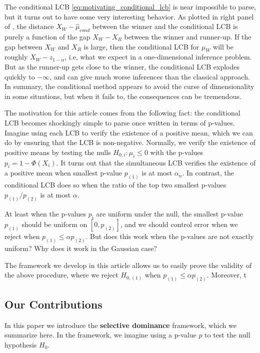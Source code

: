 \documentclass{article}
\begin{document}
The conditional LCB \eqref{eq:motivating_conditional_lcb} is near impossible to parse, but it turns out to have some very interesting behavior. As plotted in right panel of , the distance $X_W - \hat{\mu}_{cond}$ between the winner and the conditional LCB is purely a function of the gap $X_W - X_R$ between the winner and runner-up. If the gap between $X_W$ and $X_R$ is large, then the conditional LCB for $\mu_W$ will be roughly $X_{W} - z_{1-\alpha}$, i.e, what we expect in a one-dimensional inference problem. But as the runner-up gets close to the winner, the conditional LCB explodes quickly to $-\infty$, and can give much worse inferences than the classical approach. In summary, the conditional method appears to avoid the curse of dimensionality in some situations, but when it fails to, the consequences can be tremendous. 

The motivation for this article comes from the following fact: the conditional LCB becomes shockingly simple to parse once written in terms of p-values. Imagine using each LCB to verify the existence of a positive mean, which we can do by ensuring that the LCB is non-negative. Normally, we verify the existence of positive means by testing the nulls $H_{0, i} : \mu_i \leq 0$ with the p-values $p_i = 1 - \Phi(X_i)$. It turns out that the simultaneous LCB verifies the existence of a positive mean when smallest p-value $p_{(1)}$ is at most $\alpha_n$. In contrast, the conditional LCB does so when the ratio of the top two smallest p-values $p_{(1)}/p_{(2)}$ is at most $\alpha$. 


At least when the p-values $p_i$ are uniform under the null, the smallest p-value $p_{(1)}$ should be uniform on $[0, p_{(2)}]$, and we should control error when we reject when $p_{(1)} \leq \alpha p_{(2)}$. But does this work when the p-values are not exactly uniform? Why does it work in the Gaussian case?

The framework we develop in this article allows us to easily prove the validity of the above procedure, where we reject $H_{0, (1)}$ when $p_{(1)} \leq \alpha p_{(2)}$. Moreover, t



\subsection{Our Contributions}

In this paper we introduce the \textbf{selective dominance} framework, which we summarize here. In the framework, we imagine using a p-value $p$ to test the null hypothesis $H_0$. 
\end{document}
